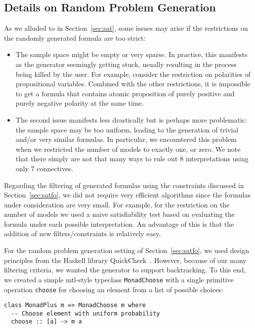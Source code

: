 \subsection{Details on Random Problem Generation}\label{appB:SAT}

As we alluded to in Section~\ref{sec:sat},
some issues may arise if the restrictions on the randomly generated formula are too strict:
\begin{itemize}
    \item
        The sample space might be empty or very sparse.
        In practice, this manifests as the generator seemingly getting stuck,
        usually resulting in the process being killed by the user. 
        For example,
        consider the restriction on polarities of propositional
        variables. %
        Combined with the other restrictions,
        it is impossible to get a formula that contains atomic proposition
        of purely positive and purely negative polarity at the same time.

    \item
        The second issue manifests less drastically but is perhaps more problematic:
        the sample space may be too uniform,
        leading to the generation of trivial and/or very similar
        formulas. 
        In particular, we encountered this problem
        when we restricted the number of models to exactly one, or zero.
        We note that there simply are not that many ways to rule out 8 interpretations
        using only 7 connectives.
\end{itemize}





Regarding the filtering of generated formulas using the constraints discussed in Section~\ref{sec:satfo},
we did not require very efficient algorithms since
the formulas under consideration are very small.
For example, for the restriction on the number of models we used a naive satisfiability test
based on evaluating the formula under each possible interpretation.
An advantage of this is that the addition of new filters/constraints is relatively easy.




For the random problem generation setting of Section~\ref{sec:satfo},
we used design principles from the Haskell library
QuickCheck~\cite{ClaessenHughes:2000:QuickCheck}.
However, because of our many filtering criteria, we wanted the generator to support backtracking.
To this end,
we created a simple mtl-style typeclass \texttt{MonadChoose}
with a single primitive operation \texttt{choose} for choosing an element from a list of possible choices:
\begin{lstlisting}
class MonadPlus m => MonadChoose m where
  -- Choose element with uniform probability
  choose :: [a] -> m a
\end{lstlisting}


